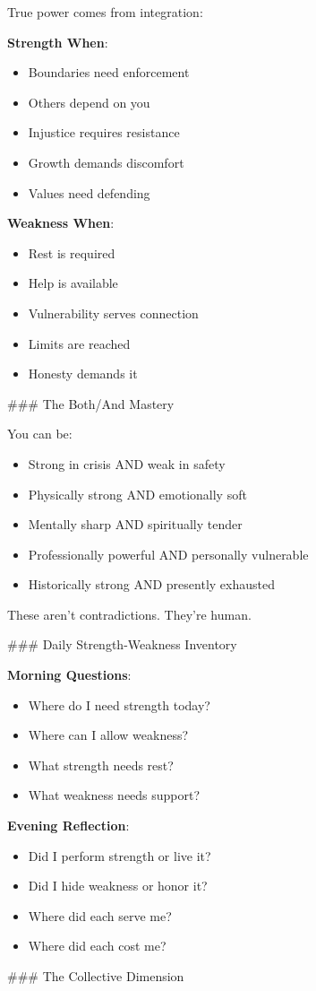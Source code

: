 \documentclass[12pt]{book}
\begin{document}
True power comes from integration:

\textbf{Strength When}:
\begin{itemize}
\item Boundaries need enforcement
\item Others depend on you
\item Injustice requires resistance
\item Growth demands discomfort
\item Values need defending

\end{itemize}
\textbf{Weakness When}:
\begin{itemize}
\item Rest is required
\item Help is available
\item Vulnerability serves connection
\item Limits are reached
\item Honesty demands it

\end{itemize}
\#\#\# The Both/And Mastery

You can be:
\begin{itemize}
\item Strong in crisis AND weak in safety
\item Physically strong AND emotionally soft
\item Mentally sharp AND spiritually tender
\item Professionally powerful AND personally vulnerable
\item Historically strong AND presently exhausted

\end{itemize}
These aren't contradictions. They're human.

\#\#\# Daily Strength-Weakness Inventory

\textbf{Morning Questions}:
\begin{itemize}
\item Where do I need strength today?
\item Where can I allow weakness?
\item What strength needs rest?
\item What weakness needs support?

\end{itemize}
\textbf{Evening Reflection}:
\begin{itemize}
\item Did I perform strength or live it?
\item Did I hide weakness or honor it?
\item Where did each serve me?
\item Where did each cost me?

\end{itemize}
\#\#\# The Collective Dimension
\end{document}
